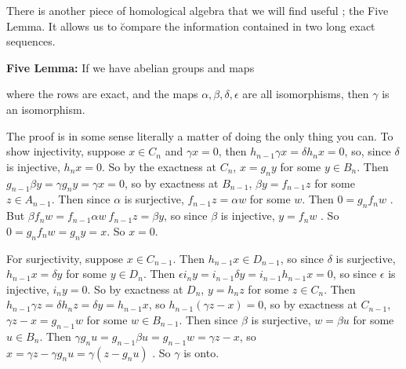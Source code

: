 \ssk


\bsk

There 
is another piece of homological algebra
that we will find useful ; the Five Lemma. It allows us to 
\u{compare} the information contained in two long exact sequences.

\msk

{\bf Five Lemma:} If we have abelian groups and maps

\ssk


\ssk

where the rows are exact, and the maps $\alpha,\beta,\delta,\epsilon$ are all isomorphisms, then $\gamma$ is an isomorphism.

\msk

The proof is in some sense literally a matter of doing the only thing you can. To show injectivity, suppose
$x\in C_n$ and $\gamma x = 0$, 
then $h_{n-1}\gamma x = \delta h_n x = 0$, so, 
since $\delta$ is injective,
$h_n x = 0$. So 
by the exactness at $C_n$, $x=g_n y$ for some $y\in B_n$. 
Then $g_{n-1} \beta y = \gamma g_n y = \gamma x = 0$, so 
by exactness at $B_{n-1}$, $\beta y = f_{n-1} z$ for some $z\in A_{n-1}$. Then 
since $\alpha$ is surjective,
$f_{n-1}z = \alpha w$ for some $w$. Then 
$0=g_n f_n w$ . But 
$\beta f_n w = f_{n-1} \alpha w \ f_{n-1} z = \beta y$, so since
$\beta$ is injective, 
$y= f_n w$ . So $0=g_n f_n w = g_n y = x$. So $x=0$.

\ssk

For surjectivity, suppose $x\in C_{n-1}$.
Then $h_{n-1} x \in D_{n-1}$, so
since $\delta$ is surjective, 
$h_{n-1} x = \delta y$ for some $y\in D_n$.
Then $\epsilon i_n y = i_{n-1}\delta y = i_{n-1} h_{n-1} x = 0$, so 
since $\epsilon$ is injective, $i_n y= 0$.
So by exactness at $D_n$, 
$y=h_n z$ for some $z\in C_n$. Then 
$h_{n-1}\gamma z = \delta h_n z = \delta y = h_{n-1} x$,
so $h_{n-1} (\gamma z-x) = 0$, so 
by exactness at $C_{n-1}$, 
$\gamma z-x = g_{n-1}w$ for some $w\in B_{n-1}$. Then
since $\beta$ is surjective, 
$w= \beta u$ for some $u\in B_n$. Then 
$\gamma g_n u = g_{n-1} \beta u = g_{n-1}w = \gamma z-x$,
so $x=\gamma z - \gamma g_n u = \gamma (z-g_n u)$ . 
So $\gamma$ is onto.


